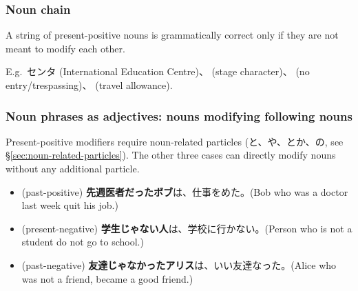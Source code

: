 \documentclass[../nihongo-gakushuu-kyouzai.tex]{subfiles}
\begin{document}
\subsubsection{Noun chain}
A string of present-positive nouns is grammatically correct only if they are not meant to modify each other.

E.g.\ センタ (International Education Centre)、 (stage character)、 (no entry/trespassing)、 (travel allowance).

\subsubsection{Noun phrases as adjectives: nouns modifying following nouns}
Present-positive modifiers require noun-related particles (と、や、とか、の, see \S\ref{sec:noun-related-particles}). The other three cases can directly modify nouns without any additional particle.
\begin{itemize}
    \item (past-positive) \textbf{先週医者だったボブ}は、仕事をめた。(Bob who was a doctor last week quit his job.)
    \item (present-negative) \textbf{学生じゃない人}は、学校に行かない。(Person who is not a student do not go to school.)
    \item (past-negative) \textbf{友達じゃなかったアリス}は、いい友達なった。(Alice who was not a friend, became a good friend.)
\end{itemize}
\end{document}
